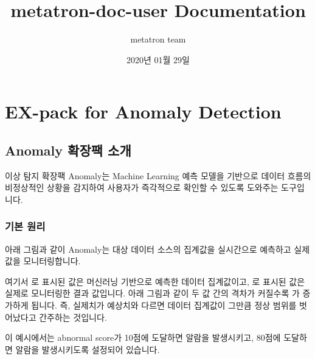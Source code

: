 \documentclass[letterpaper,10pt,english]{sphinxmanual}
\title{metatron-doc-user Documentation}
\date{2020년 01월 29일}
\author{metatron team}
\begin{document}
\pagestyle{empty}
\sphinxmaketitle
\pagestyle{plain}
\sphinxtableofcontents
\pagestyle{normal}
\label{\detokenize{index::doc}}



\part{EX-pack for Anomaly Detection}
\label{\detokenize{index:ex-pack-for-anomaly-detection}}

\chapter{Anomaly 확장팩 소개}
\label{\detokenize{part01/index:anomaly}}\label{\detokenize{part01/index::doc}}
이상 탐지 확장팩 Anomaly는 Machine Learning 예측 모델을 기반으로 데이터 흐름의 비정상적인 상황을 감지하여 사용자가 즉각적으로 확인할 수 있도록 도와주는 도구입니다.


\section{기본 원리}
\label{\detokenize{part01/index:basic-principles}}\label{\detokenize{part01/index:id1}}
아래 그림과 같이 Anomaly는 대상 데이터 소스의 집계값을 실시간으로 예측하고 실제 값을 모니터링합니다.
\begin{quote}

\begin{figure}[H]
\centering

\noindent{}
\end{figure}
\end{quote}

여기서 로 표시된 값은 머신러닝 기반으로 예측한 데이터 집계값이고, 로 표시된 값은 실제로 모니터링한 결과 값입니다. 아래 그림과 같이 두 값 간의 격차가 커질수록 가 증가하게 됩니다. 즉, 실제치가 예상치와 다르면 데이터 집계값이 그만큼 정상 범위를 벗어났다고 간주하는 것입니다.
\begin{quote}

\begin{figure}[H]
\centering

\noindent{}
\end{figure}
\end{quote}

이 예시에서는 abnormal score가 10점에 도달하면  알람을 발생시키고, 80점에 도달하면  알람을 발생시키도록 설정되어 있습니다.
\end{document}
